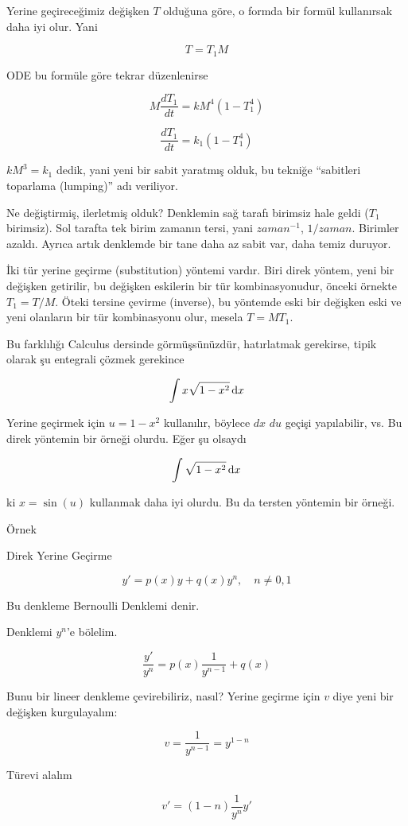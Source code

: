 \documentclass[12pt,fleqn]{article}\usepackage{../../common}
\begin{document}
Yerine geçireceğimiz değişken $T$ olduğuna göre, o formda bir formül
kullanırsak daha iyi olur. Yani

$$ T = T_1M $$

ODE bu formüle göre tekrar düzenlenirse

$$ M\frac{dT_1}{dt} = kM^4(1-T_1^4)$$

$$ \frac{dT_1}{dt} = k_1(1-T_1^4)  $$

$kM^3 = k_1$ dedik, yani yeni bir sabit yaratmış olduk, bu tekniğe
``sabitleri toparlama (lumping)'' adı veriliyor.

Ne değiştirmiş, ilerletmiş olduk? Denklemin sağ tarafı birimsiz hale geldi
($T_1$ birimsiz). Sol tarafta tek birim zamanın tersi, yani $zaman^{-1}$,
$1/zaman$. Birimler azaldı. Ayrıca artık denklemde bir tane daha az sabit
var, daha temiz duruyor.

İki tür yerine geçirme (substitution) yöntemi vardır. Biri direk yöntem,
yeni bir değişken getirilir, bu değişken eskilerin bir tür kombinasyonudur,
önceki örnekte $T_1 = T / M$. Öteki tersine çevirme (inverse), bu yöntemde
eski bir değişken eski ve yeni olanların bir tür kombinasyonu olur, mesela
$T = MT_1$.

Bu farklılığı Calculus dersinde görmüşsünüzdür, hatırlatmak gerekirse,
tipik olarak şu entegrali çözmek gerekince

$$ \int x \sqrt{1-x^2} \,\mathrm{d} x $$

Yerine geçirmek için $u = 1-x^2$ kullanılır, böylece $dx$ $du$ geçişi
yapılabilir, vs. Bu direk yöntemin bir örneği olurdu. Eğer şu olsaydı

$$ \int \sqrt{1-x^2} \,\mathrm{d} x $$

ki $x = \sin(u)$ kullanmak daha iyi olurdu. Bu da tersten yöntemin bir
örneği.

Örnek

Direk Yerine Geçirme

$$ y' = p(x)y + q(x)y^n, \quad  n \neq 0,1 $$

Bu denkleme Bernoulli Denklemi denir. 

Denklemi $y^n$'e bölelim. 

$$ \frac{y'}{y^n} = p(x) \frac{1}{y^{n-1}} + q(x) $$

Bunu bir lineer denkleme çevirebiliriz, nasıl? Yerine geçirme için $v$
diye yeni bir değişken kurgulayalım:

$$ v = \frac{1}{y^{n-1}} = y^{1-n}$$

Türevi alalım

$$ v' = (1-n)\frac{1}{y^n}y' $$
\end{document}

